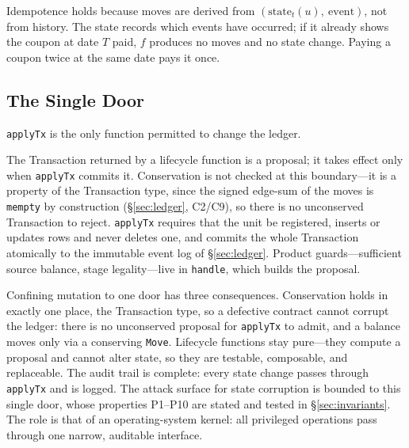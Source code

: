 Idempotence holds because moves are derived from $(\text{state}_t(u),\ \text{event})$, not from history. The state records which events have occurred; if it already shows the coupon at date $T$ paid, $f$ produces no moves and no state change. Paying a coupon twice at the same date pays it once.

\subsection{The Single Door}

\begin{principle}
\label{prin:executor}
\texttt{applyTx} is the only function permitted to change the ledger.
\end{principle}

The Transaction returned by a lifecycle function is a proposal; it takes effect only when \texttt{applyTx} commits it. Conservation is not checked at this boundary---it is a property of the Transaction type, since the signed edge-sum of the moves is \texttt{mempty} by construction (\S\ref{sec:ledger}, C2/C9), so there is no unconserved Transaction to reject. \texttt{applyTx} requires that the unit be registered, inserts or updates rows and never deletes one, and commits the whole Transaction atomically to the immutable event log of \S\ref{sec:ledger}. Product guards---sufficient source balance, stage legality---live in \texttt{handle}, which builds the proposal.

Confining mutation to one door has three consequences. Conservation holds in exactly one place, the Transaction type, so a defective contract cannot corrupt the ledger: there is no unconserved proposal for \texttt{applyTx} to admit, and a balance moves only via a conserving \texttt{Move}. Lifecycle functions stay pure---they compute a proposal and cannot alter state, so they are testable, composable, and replaceable. The audit trail is complete: every state change passes through \texttt{applyTx} and is logged. The attack surface for state corruption is bounded to this single door, whose properties P1--P10 are stated and tested in \S\ref{sec:invariants}. The role is that of an operating-system kernel: all privileged operations pass through one narrow, auditable interface.

